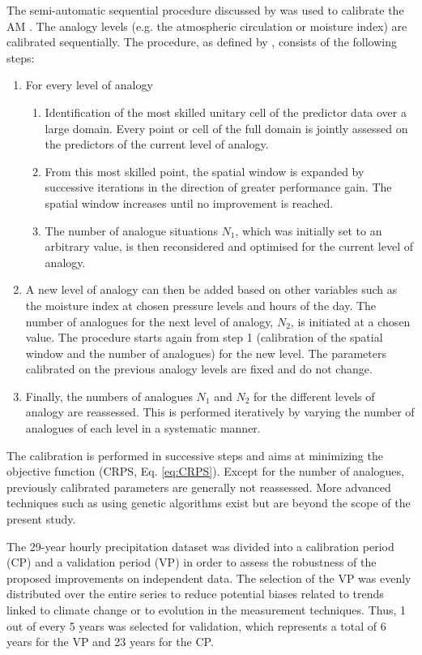 \documentclass[hess, manuscript]{copernicus}
\begin{document}
	The semi-automatic sequential procedure discussed by \citet{Bontron2004} was used to calibrate the AM \citep{Radanovics2013, BenDaoud2016}. The analogy levels (e.g. the atmospheric circulation or moisture index) are calibrated sequentially. The procedure, as defined by \citet{Bontron2004}, consists of the following steps:
	
	\begin{enumerate}
		\item For every level of analogy
		\begin{enumerate}
			\item Identification of the most skilled unitary cell of the predictor data over a large domain. Every point or cell of the full domain is jointly assessed on the predictors of the current level of analogy.
			\item From this most skilled point, the spatial window is expanded by successive iterations in the direction of greater performance gain. The spatial window increases until no improvement is reached.
			\item The number of analogue situations $N_{1}$, which was initially set to an arbitrary value, is then reconsidered and optimised for the current level of analogy.
		\end{enumerate}
		\item A new level of analogy can then be added based on other variables such as the moisture index at chosen pressure levels and hours of the day. The number of analogues for the next level of analogy, $N_{2}$, is initiated at a chosen value. The procedure starts again from step 1 (calibration of the spatial window and the number of analogues) for the new level. The parameters calibrated on the previous analogy levels are fixed and do not change. 
		\item Finally, the numbers of analogues $N_{1}$ and $N_{2}$ for the different levels of analogy are reassessed. This is performed iteratively by varying the number of analogues of each level in a systematic manner.
	\end{enumerate}
	
	The calibration is performed in successive steps and aims at minimizing the objective function (CRPS, Eq. \ref{eq:CRPS}). Except for the number of analogues, previously calibrated parameters are generally not reassessed. More advanced techniques such as using genetic algorithms \citep{Horton2017} exist but are beyond the scope of the present study.
	
	The 29-year hourly precipitation dataset was divided into a calibration period (CP) and a validation period (VP) in order to assess the robustness of the proposed improvements on independent data. The selection of the VP was evenly distributed over the entire series \citep{BenDaoud2010} to reduce potential biases related to trends linked to climate change or to evolution in the measurement techniques. Thus, 1 out of every 5 years was selected for validation, which represents a total of 6 years for the VP and 23 years for the CP.
	
\end{document}
